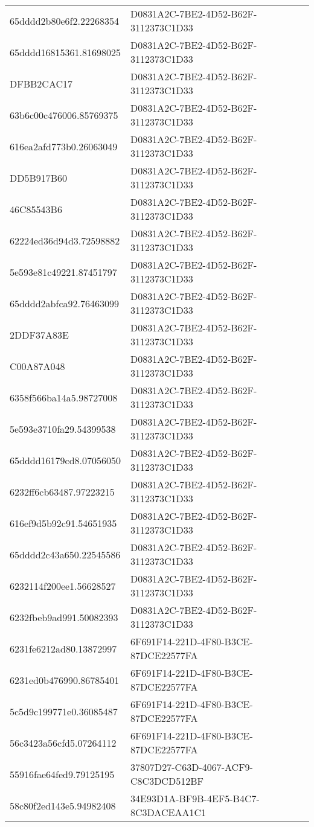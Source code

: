 \begin{tabular}{ll}
65dddd2b80e6f2.22268354 & D0831A2C-7BE2-4D52-B62F-3112373C1D33 \\
65dddd16815361.81698025 & D0831A2C-7BE2-4D52-B62F-3112373C1D33 \\
DFBB2CAC17 & D0831A2C-7BE2-4D52-B62F-3112373C1D33 \\
63b6c00c476006.85769375 & D0831A2C-7BE2-4D52-B62F-3112373C1D33 \\
616ea2afd773b0.26063049 & D0831A2C-7BE2-4D52-B62F-3112373C1D33 \\
DD5B917B60 & D0831A2C-7BE2-4D52-B62F-3112373C1D33 \\
46C85543B6 & D0831A2C-7BE2-4D52-B62F-3112373C1D33 \\
62224ed36d94d3.72598882 & D0831A2C-7BE2-4D52-B62F-3112373C1D33 \\
5e593e81c49221.87451797 & D0831A2C-7BE2-4D52-B62F-3112373C1D33 \\
65dddd2abfca92.76463099 & D0831A2C-7BE2-4D52-B62F-3112373C1D33 \\
2DDF37A83E & D0831A2C-7BE2-4D52-B62F-3112373C1D33 \\
C00A87A048 & D0831A2C-7BE2-4D52-B62F-3112373C1D33 \\
6358f566ba14a5.98727008 & D0831A2C-7BE2-4D52-B62F-3112373C1D33 \\
5e593e3710fa29.54399538 & D0831A2C-7BE2-4D52-B62F-3112373C1D33 \\
65dddd16179cd8.07056050 & D0831A2C-7BE2-4D52-B62F-3112373C1D33 \\
6232ff6cb63487.97223215 & D0831A2C-7BE2-4D52-B62F-3112373C1D33 \\
616ef9d5b92c91.54651935 & D0831A2C-7BE2-4D52-B62F-3112373C1D33 \\
65dddd2c43a650.22545586 & D0831A2C-7BE2-4D52-B62F-3112373C1D33 \\
6232114f200ee1.56628527 & D0831A2C-7BE2-4D52-B62F-3112373C1D33 \\
6232fbeb9ad991.50082393 & D0831A2C-7BE2-4D52-B62F-3112373C1D33 \\
6231fe6212ad80.13872997 & 6F691F14-221D-4F80-B3CE-87DCE22577FA \\
6231ed0b476990.86785401 & 6F691F14-221D-4F80-B3CE-87DCE22577FA \\
5c5d9c199771e0.36085487 & 6F691F14-221D-4F80-B3CE-87DCE22577FA \\
56c3423a56cfd5.07264112 & 6F691F14-221D-4F80-B3CE-87DCE22577FA \\
55916fae64fed9.79125195 & 37807D27-C63D-4067-ACF9-C8C3DCD512BF \\
58c80f2ed143e5.94982408 & 34E93D1A-BF9B-4EF5-B4C7-8C3DACEAA1C1 \\

\end{tabular}
